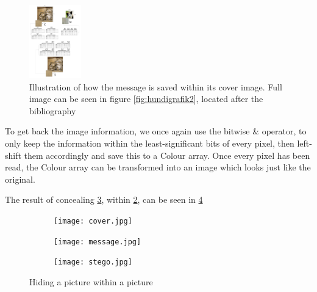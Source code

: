 \begin{figure}
		\centering
		\includegraphics[width=0.2\textwidth]{figures/hundikatgrafik2.png}
		\caption{Illustration of how the message is saved within its cover image. Full image can be seen in figure \ref{fig:hundigrafik2}, located after the bibliography}
		\label{fig:hundigrafik}
\end{figure}
To get back the image information, we once again use the bitwise \& operator, to only keep the information within the least-significant bits of every pixel, then left-shift them accordingly and save this to a Colour array. Once every pixel has been read, the Colour array can be transformed into an image which looks just like the original.

The result of concealing \ref{img2}, within \ref{img1}, can be seen in \ref{img3}

\begin{figure}[]
	\centering
	\begin{subfigure}[b]{.3\linewidth}
		\texttt{[image: cover.jpg]}
		\label{img1}
	\end{subfigure}
	\hspace{.02\linewidth}
	\begin{subfigure}[b]{.15\linewidth}
		\texttt{[image: message.jpg]}
		\label{img2}
	\end{subfigure}
	\hspace{.02\linewidth}

	\begin{subfigure}[b]{.3\linewidth}
		\texttt{[image: stego.jpg]}
		\label{img3}
	\end{subfigure}
	\caption{Hiding a picture within a picture}\label{LSBDemo}
\end{figure} 


